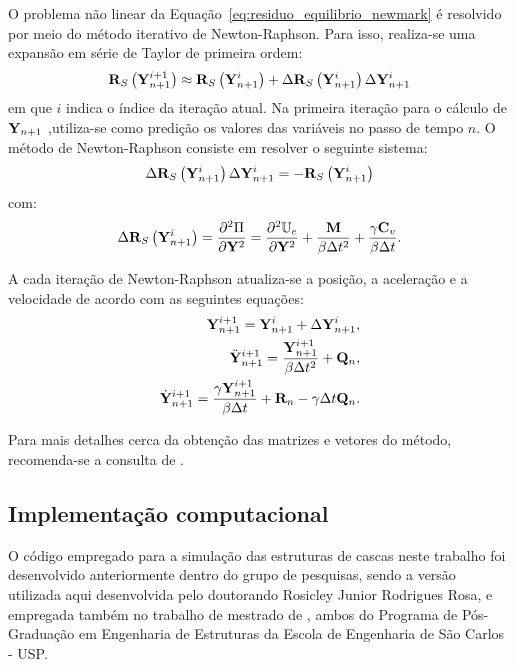 O problema não linear da Equação~\eqref{eq:residuo_equilibrio_newmark} é resolvido por meio do método iterativo de Newton-Raphson. Para isso, realiza-se uma expansão em série de Taylor de primeira ordem:
\begin{gather}
	\mathbf{R}_S\left(\mathbf{Y}_{n+1}^{i+1}\right) \approx \mathbf{R}_S\left(\mathbf{Y}_{n+1}^{i}\right) + \Delta\mathbf{R}_S\left(\mathbf{Y}_{n+1}^{i}\right)\Delta\mathbf{Y}_{n+1}^{i} 
\end{gather}
\noindent em que $i$ indica o índice da iteração atual. Na primeira iteração para o cálculo de $\mathbf{Y}_{n+1}$ ,utiliza-se como predição os valores das variáveis no passo de tempo $n$. O método de Newton-Raphson consiste em resolver o seguinte sistema:
\begin{gather}
	\Delta\mathbf{R}_S\left(\mathbf{Y}_{n+1}^{i}\right)\Delta\mathbf{Y}_{n+1}^{i} = -\mathbf{R}_S\left(\mathbf{Y}_{n+1}^{i}\right) \label{eq:NR}
\end{gather}
\noindent com:
\begin{gather}
	\Delta\mathbf{R}_S\left(\mathbf{Y}_{n+1}^{i}\right) = \frac{\partial^{2}\Pi}{\partial\mathbf{Y}^{2}} = \frac{\partial^{2}\mathbb{U}_e}{\partial \mathbf{Y}^{2}} + \frac{\mathbf{M}}{\beta \Delta t^2} + \frac{\gamma \mathbf{C}_v}{\beta \Delta t}.
\end{gather}

A cada iteração de Newton-Raphson atualiza-se a posição, a aceleração e a velocidade de acordo com as seguintes equações:
\begin{align}
	\mathbf{Y}_{n+1}^{i+1} = \mathbf{Y}_{n+1}^{i} + \Delta\mathbf{Y}_{n+1}^{i} \label{eq:UD1},\\
	\ddot{\mathbf{Y}}_{n+1}^{i+1} = \frac{\mathbf{Y}_{n+1}^{i+1}}{\beta \Delta t^2} + \mathbf{Q}_n  \label{eq:UD2}, \\
	\dot{\mathbf{Y}}_{n+1}^{i+1} = \frac{\gamma \mathbf{Y}_{n+1}^{i+1}}{\beta \Delta t} + \mathbf{R}_n - \gamma\Delta t \mathbf{Q}_n.  \label{eq:UD3}
\end{align}

Para mais detalhes cerca da obtenção das matrizes e vetores do método, recomenda-se a consulta de .

\subsection{Implementação computacional}

O código empregado para a simulação das estruturas de cascas neste trabalho foi desenvolvido anteriormente dentro do grupo de pesquisas, sendo a versão utilizada aqui desenvolvida pelo doutorando Rosicley Junior Rodrigues Rosa, e empregada também no trabalho de mestrado de , ambos do Programa de Pós-Graduação em Engenharia de Estruturas da Escola de Engenharia de São Carlos - USP. 

